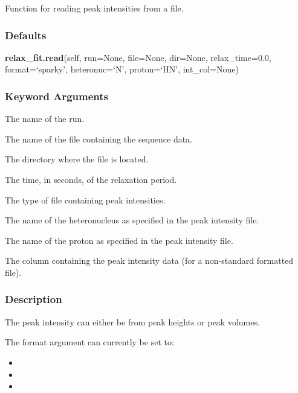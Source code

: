  Function for reading peak intensities from a file. 
  

  
 \subsubsection{Defaults} 

 \textsf{\textbf{relax\_fit.read}(self, run=None, file=None, dir=None, relax\_time=0.0, format=`sparky', heteronuc=`N', proton=`HN', int\_col=None)} 

  
 \subsubsection{Keyword Arguments} 

   The name of the run.   

   The name of the file containing the sequence data.   

   The directory where the file is located.   

   The time, in seconds, of the relaxation period.   

   The type of file containing peak intensities.   

   The name of the heteronucleus as specified in the peak intensity file.   

   The name of the proton as specified in the peak intensity file.   

   The column containing the peak intensity data (for a non-standard formatted file).  

  

  
 \subsubsection{Description} 

 The peak intensity can either be from peak heights or peak volumes. 
  

 The format argument can currently be set to: 
  

 \begin{itemize} 
 \item[]   
 \item[]   
 \item[]  
 \end{itemize} 
  

